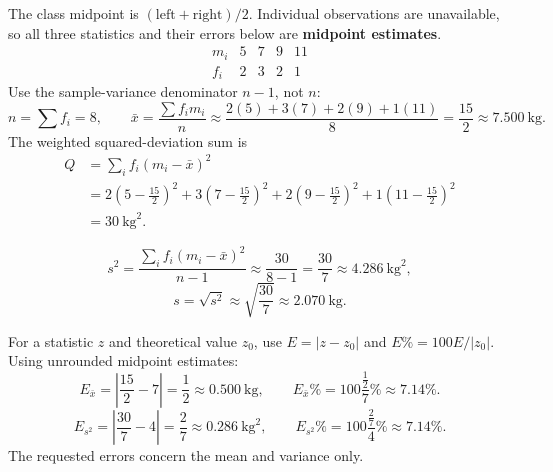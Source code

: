 
The class midpoint is $(\text{left}+\text{right})/2$. Individual observations are unavailable, so all three statistics and their errors below are \textbf{midpoint estimates}.\[\begin{array}{c|rrrr}m_i&5&7&9&11\\\hline f_i&2&3&2&1\end{array}\]
Use the sample-variance denominator $n-1$, not $n$:
\[n=\sum f_i=8,\qquad\bar x=\frac{\sum f_im_i}{n}\approx\frac{2(5)+3(7)+2(9)+1(11)}{8}=\frac{15}{2}\approx7.500\ \mathrm{kg}.\]
The weighted squared-deviation sum is
\[\begin{aligned}Q&=\sum_i f_i(m_i-\bar x)^2\\&=2\left(5-\frac{15}{2}\right)^2+3\left(7-\frac{15}{2}\right)^2+2\left(9-\frac{15}{2}\right)^2+1\left(11-\frac{15}{2}\right)^2\\&=30\ \mathrm{kg}^2.\end{aligned}\]
\begin{samepage}\[s^2=\frac{\sum_i f_i(m_i-\bar x)^2}{n-1}\approx\frac{30}{8-1}=\frac{30}{7}\approx4.286\ \mathrm{kg}^2,\]
\[s=\sqrt{s^2}\approx\sqrt{\frac{30}{7}}\approx2.070\ \mathrm{kg}.\]\end{samepage}


For a statistic $z$ and theoretical value $z_0$, use $E=|z-z_0|$ and $E\%=100E/|z_0|$.
Using unrounded midpoint estimates:
\[E_{\bar x}=\left|\frac{15}{2}-7\right|=\frac{1}{2}\approx0.500\ \mathrm{kg},\qquad
E_{\bar x}\%=100\frac{\frac{1}{2}}{7}\%\approx7.14\%.\]
\[E_{s^2}=\left|\frac{30}{7}-4\right|=\frac{2}{7}\approx0.286\ \mathrm{kg}^2,\qquad
E_{s^2}\%=100\frac{\frac{2}{7}}{4}\%\approx7.14\%.\]
The requested errors concern the mean and variance only.


